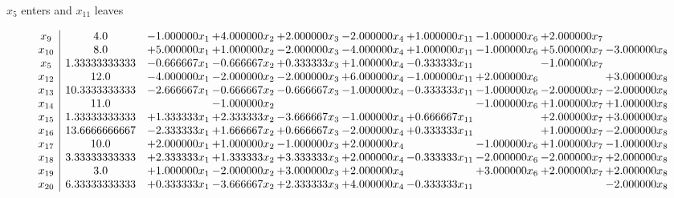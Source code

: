 \documentclass[10pt]{article}
\begin{document}
 $ x_{5} $ enters and $ x_{11} $ leaves 

 \[\begin{array}{c| c c@{\hskip 2pt} c@{\hskip 2pt} c@{\hskip 2pt} c@{\hskip 2pt} c@{\hskip 2pt} c@{\hskip 2pt} c@{\hskip 2pt} c@{\hskip 2pt} }
 x_{9}   &  4.0 & -1.000000 x_{1} & + 4.000000 x_{2} & + 2.000000 x_{3} & -2.000000 x_{4} & + 1.000000 x_{11} & -1.000000 x_{6} & + 2.000000 x_{7} &   \\
 x_{10}   &  8.0 & + 5.000000 x_{1} & + 1.000000 x_{2} & -2.000000 x_{3} & -4.000000 x_{4} & + 1.000000 x_{11} & -1.000000 x_{6} & + 5.000000 x_{7} & -3.000000 x_{8}\\
 x_{5}   &  1.33333333333 & -0.666667 x_{1} & -0.666667 x_{2} & + 0.333333 x_{3} & + 1.000000 x_{4} & -0.333333 x_{11} &   & -1.000000 x_{7} &   \\
 x_{12}   &  12.0 & -4.000000 x_{1} & -2.000000 x_{2} & -2.000000 x_{3} & + 6.000000 x_{4} & -1.000000 x_{11} & + 2.000000 x_{6} &   & + 3.000000 x_{8}\\
 x_{13}   &  10.3333333333 & -2.666667 x_{1} & -0.666667 x_{2} & -0.666667 x_{3} & -1.000000 x_{4} & -0.333333 x_{11} & -1.000000 x_{6} & -2.000000 x_{7} & -2.000000 x_{8}\\
 x_{14}   &  11.0  &   & -1.000000 x_{2} &    &    &   & -1.000000 x_{6} & + 1.000000 x_{7} & + 1.000000 x_{8}\\
 x_{15}   &  1.33333333333 & + 1.333333 x_{1} & + 2.333333 x_{2} & -3.666667 x_{3} & -1.000000 x_{4} & + 0.666667 x_{11} &   & + 2.000000 x_{7} & + 3.000000 x_{8}\\
 x_{16}   &  13.6666666667 & -2.333333 x_{1} & + 1.666667 x_{2} & + 0.666667 x_{3} & -2.000000 x_{4} & + 0.333333 x_{11} &   & + 1.000000 x_{7} & -2.000000 x_{8}\\
 x_{17}   &  10.0 & + 2.000000 x_{1} & + 1.000000 x_{2} & -1.000000 x_{3} & + 2.000000 x_{4} &   & -1.000000 x_{6} & + 1.000000 x_{7} & -1.000000 x_{8}\\
 x_{18}   &  3.33333333333 & + 2.333333 x_{1} & + 1.333333 x_{2} & + 3.333333 x_{3} & + 2.000000 x_{4} & -0.333333 x_{11} & -2.000000 x_{6} & -2.000000 x_{7} & + 2.000000 x_{8}\\
 x_{19}   &  3.0 & + 1.000000 x_{1} & -2.000000 x_{2} & + 3.000000 x_{3} & + 2.000000 x_{4} &   & + 3.000000 x_{6} & + 2.000000 x_{7} & + 2.000000 x_{8}\\
 x_{20}   &  6.33333333333 & + 0.333333 x_{1} & -3.666667 x_{2} & + 2.333333 x_{3} & + 4.000000 x_{4} & -0.333333 x_{11} &    &   & -2.000000 x_{8}\\

\end{array}\]
\end{document}
